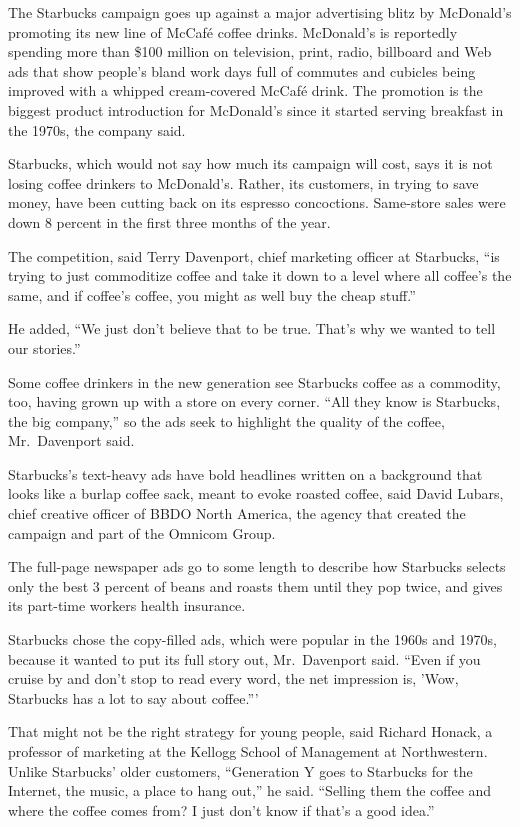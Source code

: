 \documentclass[12pt,a4paper,onecolumn]{article}
\begin{document}
The Starbucks campaign goes up against a major advertising blitz by McDonald's promoting its new
line of McCaf\'e coffee drinks. McDonald's is reportedly spending more than \$100 million on
television, print, radio, billboard and Web ads that show people's bland work days full of commutes
and cubicles being improved with a whipped cream-covered McCaf\'e drink. The promotion is the
biggest product introduction for McDonald's since it started serving breakfast in the 1970s, the
company said.

Starbucks, which would not say how much its campaign will cost, says it is not losing coffee
drinkers to McDonald's. Rather, its customers, in trying to save money, have been cutting back on
its espresso concoctions. Same-store sales were down 8 percent in the first three months of the
year.

The competition, said Terry Davenport, chief marketing officer at Starbucks, ``is trying to just
commoditize coffee and take it down to a level where all coffee's the same, and if coffee's coffee,
you might as well buy the cheap stuff.''

He added, ``We just don't believe that to be true. That's why we wanted to tell our stories.''

Some coffee drinkers in the new generation see Starbucks coffee as a commodity, too, having grown up
with a store on every corner. ``All they know is Starbucks, the big company,'' so the ads seek to
highlight the quality of the coffee, Mr.~Davenport said.

Starbucks's text-heavy ads have bold headlines written on a background that looks like a burlap
coffee sack, meant to evoke roasted coffee, said David Lubars, chief creative officer of BBDO North
America, the agency that created the campaign and part of the Omnicom Group.

The full-page newspaper ads go to some length to describe how Starbucks selects only the best 3
percent of beans and roasts them until they pop twice, and gives its part-time workers health
insurance.

Starbucks chose the copy-filled ads, which were popular in the 1960s and 1970s, because it wanted to
put its full story out, Mr.~Davenport said. ``Even if you cruise by and don't stop to read every
word, the net impression is, 'Wow, Starbucks has a lot to say about coffee.'''

That might not be the right strategy for young people, said Richard Honack, a professor of marketing
at the Kellogg School of Management at Northwestern. Unlike Starbucks' older customers, ``Generation
Y goes to Starbucks for the Internet, the music, a place to hang out,'' he said. ``Selling them the
coffee and where the coffee comes from? I just don't know if that's a good idea.''
\end{document}
